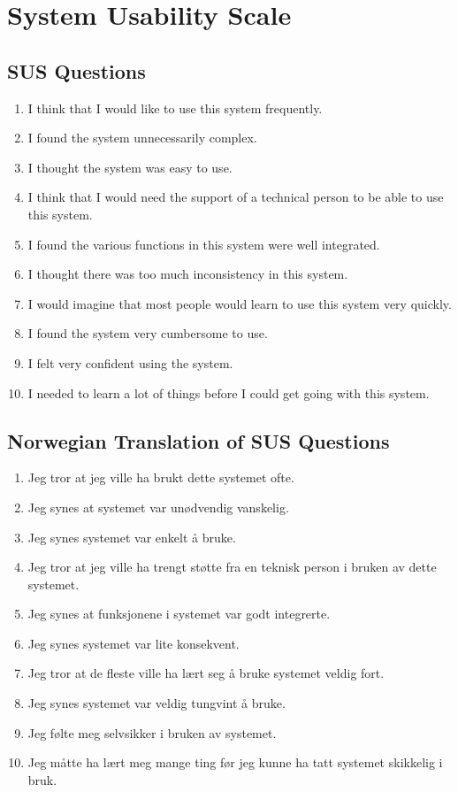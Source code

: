 \documentclass[../Main/thesis.tex]{subfiles}
\begin{document}
\chapter{System Usability Scale}
\label{app:sus}
\section{SUS Questions}
\begin{enumerate}
	\item I think that I would like to use this system frequently.
	\item I found the system unnecessarily complex.
	\item I thought the system was easy to use.
	\item I think that I would need the support of a technical person to be able to use this system.
	\item I found the various functions in this system were well integrated.
	\item I thought there was too much inconsistency in this system.
	\item I would imagine that most people would learn to use this system very quickly.
	\item I found the system very cumbersome to use.
	\item I felt very confident using the system.
	\item I needed to learn a lot of things before I could get going with this system.
\end{enumerate}

\newpage

\section{Norwegian Translation of SUS Questions}
\begin{enumerate}
	\item Jeg tror at jeg ville ha brukt dette systemet ofte.
	\item Jeg synes at systemet var unødvendig vanskelig.
	\item Jeg synes systemet var enkelt å bruke.
	\item Jeg tror at jeg ville ha trengt støtte fra en teknisk person i bruken av dette systemet.
	\item Jeg synes at funksjonene i systemet var godt integrerte.
	\item Jeg synes systemet var lite konsekvent.
	\item Jeg tror at de fleste ville ha lært seg å bruke systemet veldig fort.
	\item Jeg synes systemet var veldig tungvint å bruke.
	\item Jeg følte meg selvsikker i bruken av systemet.
	\item Jeg måtte ha lært meg mange ting før jeg kunne ha tatt systemet skikkelig i bruk.
\end{enumerate}
\end{document}
